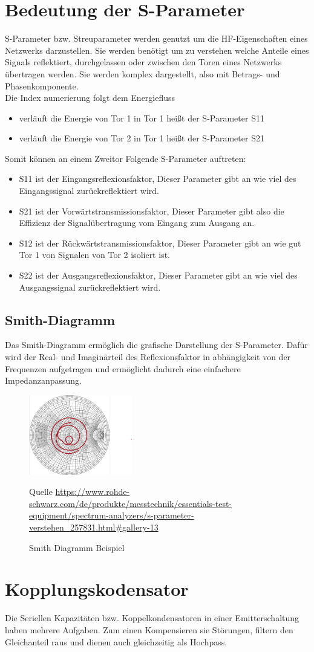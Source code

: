 \section{Bedeutung der S-Parameter}
S-Parameter bzw. Streuparameter werden genutzt um die HF-Eigenschaften eines
Netzwerks darzustellen. Sie werden benötigt um zu verstehen welche Anteile eines Signals
reflektiert, durchgelassen oder zwischen den Toren eines Netzwerks übertragen werden.
Sie werden komplex dargestellt, also mit Betrags- und Phasenkomponente.
\\
Die Index numerierung folgt dem Energiefluss
\clearpage

\begin{itemize}
    \item verläuft die Energie von Tor 1 in Tor 1 heißt der S-Parameter S11
    \item verläuft die Energie von Tor 2 in Tor 1 heißt der S-Parameter S21
\end{itemize}
Somit können an einem Zweitor Folgende S-Parameter auftreten:
\begin{itemize}
    \item S11 ist der Eingangsreflexionsfaktor, Dieser Parameter gibt an wie viel des Eingangssignal zurückreflektiert wird.
    \item S21 ist der Vorwärtstransmissionsfaktor, Dieser Parameter gibt also die Effizienz der Signalübertragung vom Eingang zum Ausgang an.
    \item S12 ist der Rückwärtstransmissionsfaktor, Dieser Parameter gibt an wie gut Tor 1 von Signalen von Tor 2 isoliert ist.
    \item S22 ist der Ausgangsreflexionsfaktor, Dieser Parameter gibt an wie viel des Ausgangssignal zurückreflektiert wird.
\end{itemize}
\subsection{Smith-Diagramm}
Das Smith-Diagramm ermöglich die grafische Darstellung der S-Parameter.
Dafür wird der Real- und Imaginärteil des Reflexionsfaktor in abhängigkeit von der Frequenzen
aufgetragen und ermöglicht dadurch eine einfachere Impedanzanpassung.
\begin{figure}[h]
    \centering
    \includegraphics[width=0.4\textwidth]{Pictures/SmithDiagram.png}
    \caption{Smith Diagramm Beispiel}
    \footnotesize{Quelle \url{https://www.rohde-schwarz.com/de/produkte/messtechnik/essentials-test-equipment/spectrum-analyzers/s-parameter-verstehen_257831.html#gallery-13}}
\end{figure}
\section{Kopplungskodensator}
Die Seriellen Kapazitäten bzw. Koppelkondensatoren in einer Emitterschaltung haben mehrere Aufgaben. Zum einen Kompensieren sie Störungen, filtern den Gleichanteil
raus und dienen auch gleichzeitig als Hochpass.
\clearpage